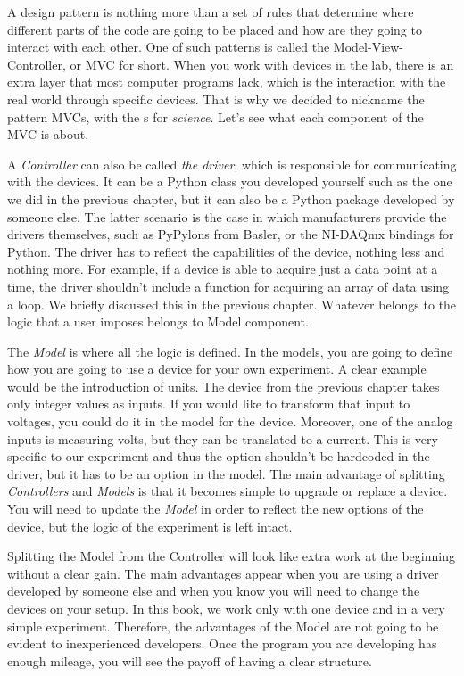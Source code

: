A design pattern is nothing more than a set of rules that determine where different parts of the code are going to be placed and how are they going to interact with each other. One of such patterns is called the Model-View-Controller, or MVC for short. When you work with devices in the lab, there is an extra layer that most computer programs lack, which is the interaction with the real world through specific devices. That is why we decided to nickname the pattern MVCs, with the s for \emph{science}. Let's see what each component of the MVC is about. 

A \emph{Controller} can also be called \emph{the driver}, which is responsible for communicating with the devices. It can be a Python class you developed yourself such as the one we did in the previous chapter, but it can also be a Python package developed by someone else. The latter scenario is the case in which manufacturers provide the drivers themselves, such as PyPylons from Basler, or the NI-DAQmx bindings for Python. The driver has to reflect the capabilities of the device, nothing less and nothing more. For example, if a device is able to acquire just a data point at a time, the
driver shouldn't include a function for acquiring an array of data using a loop. We briefly discussed this in the previous chapter. Whatever belongs to the logic that a user imposes belongs to Model component. 

The \emph{Model} is where all the logic is defined. In the models, you are going to define how you are going to use a device for your own experiment. A clear example would be the introduction of units. The device from the previous chapter takes only integer values as inputs. If you would like to transform that input to voltages, you could do it in the model for the device. Moreover, one of the analog  inputs is measuring volts, but they can be translated to a current. This is very specific to our experiment and thus the option shouldn't be hardcoded in the driver, but it has to be an option in the model. The main advantage of splitting \emph{Controllers} and \emph{Models} is that it becomes simple to upgrade or replace a device. You will need to update the \emph{Model} in order to reflect the new options of the device, but the logic of the experiment is left intact. 

Splitting the Model from the Controller will look like extra work at the beginning without a clear gain. The main advantages appear when you are using a driver developed by someone else and when you know you will need to change the devices on your setup. In this book, we work only with one device and in a very simple experiment. Therefore, the advantages of the Model are not going to be evident to inexperienced developers. Once the program you are developing has enough mileage, you will see the payoff of having a clear structure. 

